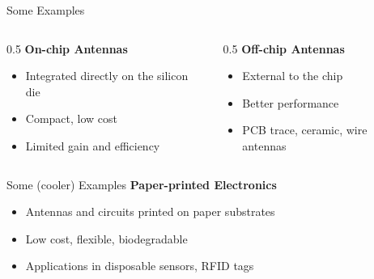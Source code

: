 \documentclass[aspectratio=169,11pt]{beamer}
\begin{document}
\begin{frame}{Some Examples}
    \begin{columns}
        \begin{column}{0.5\textwidth}
            \textbf{On-chip Antennas}
            \begin{itemize}
                \item Integrated directly on the silicon die
                \item Compact, low cost
                \item Limited gain and efficiency
            \end{itemize}
        \end{column}
        \begin{column}{0.5\textwidth}
            \textbf{Off-chip Antennas}
            \begin{itemize}
                \item External to the chip
                \item Better performance
                \item PCB trace, ceramic, wire antennas
            \end{itemize}
        \end{column}
    \end{columns}
\end{frame}

\begin{frame}{Some (cooler) Examples}
    \textbf{Paper-printed Electronics}
    \begin{itemize}
        \item Antennas and circuits printed on paper substrates
        \item Low cost, flexible, biodegradable
        \item Applications in disposable sensors, RFID tags
    \end{itemize}
\end{frame}
\end{document}
